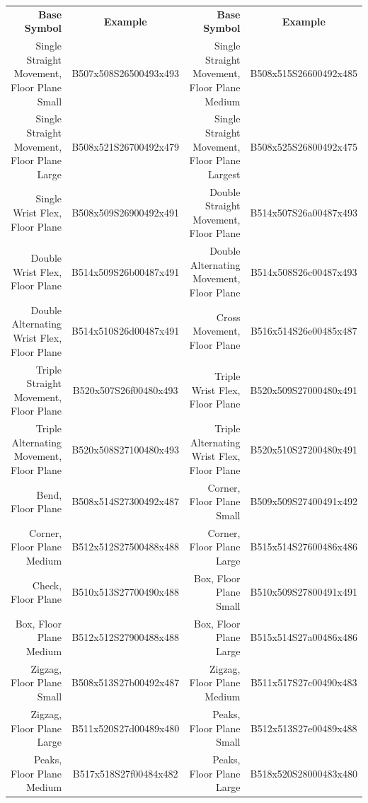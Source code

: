 \documentclass{article}
\begin{document}
\begin{center}
\begin{tabular}{rcrc}
\textbf{Base Symbol}&\textbf{Example}&\textbf{Base Symbol}&\textbf{Example}\\
Single Straight Movement, Floor Plane Small&B507x508S26500493x493&Single Straight Movement, Floor Plane Medium &B508x515S26600492x485\\
Single Straight Movement, Floor Plane Large&B508x521S26700492x479&Single Straight Movement, Floor Plane Largest&B508x525S26800492x475\\
Single Wrist Flex, Floor Plane             &B508x509S26900492x491&Double Straight Movement, Floor Plane        &B514x507S26a00487x493\\
Double Wrist Flex, Floor Plane             &B514x509S26b00487x491&Double Alternating Movement, Floor Plane     &B514x508S26c00487x493\\
Double Alternating Wrist Flex, Floor Plane &B514x510S26d00487x491&Cross Movement, Floor Plane                  &B516x514S26e00485x487\\
Triple Straight Movement, Floor Plane      &B520x507S26f00480x493&Triple Wrist Flex, Floor Plane               &B520x509S27000480x491\\
Triple Alternating Movement, Floor Plane   &B520x508S27100480x493&Triple Alternating Wrist Flex, Floor Plane   &B520x510S27200480x491\\
Bend, Floor Plane                          &B508x514S27300492x487&Corner, Floor Plane Small                    &B509x509S27400491x492\\
Corner, Floor Plane Medium                 &B512x512S27500488x488&Corner, Floor Plane Large                    &B515x514S27600486x486\\
Check, Floor Plane                         &B510x513S27700490x488&Box, Floor Plane Small                       &B510x509S27800491x491\\
Box, Floor Plane Medium                    &B512x512S27900488x488&Box, Floor Plane Large                       &B515x514S27a00486x486\\
Zigzag, Floor Plane Small                  &B508x513S27b00492x487&Zigzag, Floor Plane Medium                   &B511x517S27c00490x483\\
Zigzag, Floor Plane Large                  &B511x520S27d00489x480&Peaks, Floor Plane Small                     &B512x513S27e00489x488\\
Peaks, Floor Plane Medium                  &B517x518S27f00484x482&Peaks, Floor Plane Large                     &B518x520S28000483x480\\

\end{tabular}
\end{center}
\end{document}
